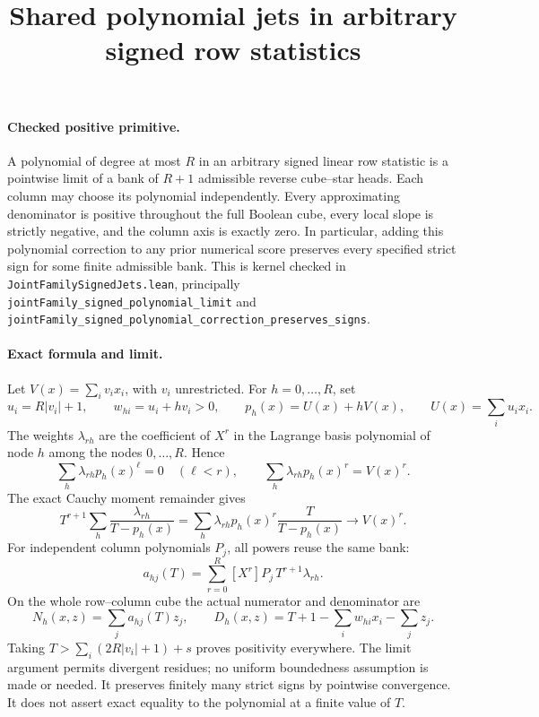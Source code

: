 \documentclass{article}
\begin{document}
\title{Shared polynomial jets in arbitrary signed row statistics}
\maketitle

\paragraph{Checked positive primitive.}
A polynomial of degree at most $R$ in an arbitrary signed linear row
statistic is a pointwise limit of a bank of $R+1$ admissible reverse
cube--star heads. Each column may choose its polynomial independently.
Every approximating denominator is positive throughout the full Boolean
cube, every local slope is strictly negative, and the column axis is
exactly zero. In particular, adding this polynomial correction to any
prior numerical score preserves every specified strict sign for some
finite admissible bank. This is kernel checked in
\texttt{JointFamilySignedJets.lean}, principally
\texttt{jointFamily\_signed\_polynomial\_limit} and
\texttt{jointFamily\_signed\_polynomial\_correction\_preserves\_signs}.

\paragraph{Exact formula and limit.}
Let $V(x)=\sum_i v_i x_i$, with $v_i$ unrestricted. For $h=0,\ldots,R$, set
\[
 u_i=R|v_i|+1,\qquad w_{hi}=u_i+h v_i>0,
 \qquad p_h(x)=U(x)+hV(x),\qquad U(x)=\sum_i u_i x_i.
\]
The weights $\lambda_{rh}$ are the coefficient of $X^r$ in the Lagrange
basis polynomial of node $h$ among the nodes $0,\ldots,R$. Hence
\[
 \sum_h\lambda_{rh}p_h(x)^\ell=0\quad(\ell<r),
 \qquad \sum_h\lambda_{rh}p_h(x)^r=V(x)^r.
\]
The exact Cauchy moment remainder gives
\[
 T^{r+1}\sum_h\frac{\lambda_{rh}}{T-p_h(x)}
  =\sum_h\lambda_{rh}p_h(x)^r\frac{T}{T-p_h(x)}
  \longrightarrow V(x)^r.
\]
For independent column polynomials $P_j$, all powers reuse the same bank:
\[
 a_{hj}(T)=\sum_{r=0}^R [X^r]P_j\,T^{r+1}\lambda_{rh}.
\]
On the whole row--column cube the actual numerator and denominator are
\[
 N_h(x,z)=\sum_j a_{hj}(T)z_j,\qquad
 D_h(x,z)=T+1-\sum_iw_{hi}x_i-\sum_jz_j.
\]
Taking $T>\sum_i(2R|v_i|+1)+s$ proves positivity everywhere. The limit
argument permits divergent residues; no uniform boundedness assumption
is made or needed. It preserves finitely many strict signs by pointwise
convergence. It does not assert exact equality to the polynomial at a
finite value of $T$.
\end{document}
